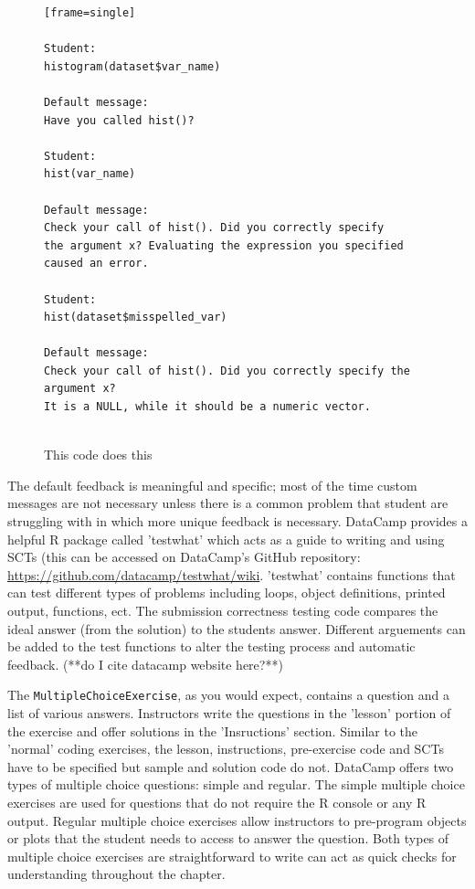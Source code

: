\documentclass[12pt]{article}
\begin{document}
\begin{figure}
\caption{This code does this}
\begin{verbatim}[frame=single]

Student:
histogram(dataset$var_name)

Default message:
Have you called hist()?

Student:
hist(var_name)

Default message:
Check your call of hist(). Did you correctly specify 
the argument x? Evaluating the expression you specified
caused an error.

Student:
hist(dataset$misspelled_var)

Default message:
Check your call of hist(). Did you correctly specify the argument x? 
It is a NULL, while it should be a numeric vector.


\end{verbatim}
\label{fig:code1}
\end{figure}

The default feedback is meaningful and specific; most of the time custom 
messages are not necessary unless there is a common problem that student are struggling with in which more unique feedback is necessary. 
DataCamp provides a helpful R package called 'testwhat' which acts as a guide to writing and using SCTs (this can be accessed on DataCamp's GitHub 
repository: \url{https://github.com/datacamp/testwhat/wiki}. 
'testwhat' contains functions that can test different types of problems including loops, object definitions, printed output, functions, ect.
The submission correctness testing code compares the ideal answer (from the solution) to the students answer. Different
arguements can be added to the test functions to alter the testing process and automatic feedback. (**do I cite datacamp website here?**)





The \texttt{MultipleChoiceExercise}, as you would expect, contains a question and a list of various answers. Instructors write the questions in the 'lesson'
portion of the exercise and offer solutions in the 'Insructions' section. Similar to the 'normal' coding exercises, the lesson, instructions, pre-exercise 
code and SCTs have to be specified but sample and solution code do not. DataCamp offers two types of multiple choice questions: simple and regular. 
The simple multiple choice exercises are used for questions that do not require the R console or any R output. Regular multiple choice exercises 
allow instructors to pre-program objects or plots that the student needs to access to answer the question. Both types of multiple choice exercises 
are straightforward to write can act as quick checks for understanding throughout the chapter.
\end{document}
